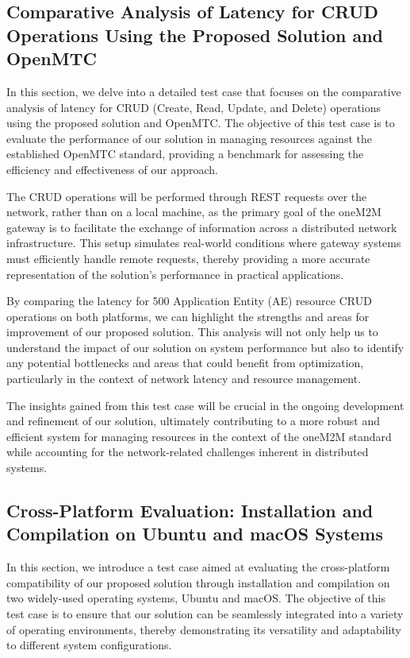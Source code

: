 \documentclass[a4paper,fleqn]{cas-dc}
\begin{document}
\subsection{Comparative Analysis of Latency for CRUD Operations Using the Proposed Solution and OpenMTC}

In this section, we delve into a detailed test case that focuses on the comparative analysis of latency for CRUD (Create, Read, Update, and Delete) operations using the proposed solution and OpenMTC. The objective of this test case is to evaluate the performance of our solution in managing resources against the established OpenMTC standard, providing a benchmark for assessing the efficiency and effectiveness of our approach.

The CRUD operations will be performed through REST requests over the network, rather than on a local machine, as the primary goal of the oneM2M gateway is to facilitate the exchange of information across a distributed network infrastructure. This setup simulates real-world conditions where gateway systems must efficiently handle remote requests, thereby providing a more accurate representation of the solution's performance in practical applications.

By comparing the latency for 500 Application Entity (AE) resource CRUD operations on both platforms, we can highlight the strengths and areas for improvement of our proposed solution. This analysis will not only help us to understand the impact of our solution on system performance but also to identify any potential bottlenecks and areas that could benefit from optimization, particularly in the context of network latency and resource management.

The insights gained from this test case will be crucial in the ongoing development and refinement of our solution, ultimately contributing to a more robust and efficient system for managing resources in the context of the oneM2M standard while accounting for the network-related challenges inherent in distributed systems.

\subsection{Cross-Platform Evaluation: Installation and Compilation on Ubuntu and macOS Systems}

In this section, we introduce a test case aimed at evaluating the cross-platform compatibility of our proposed solution through installation and compilation on two widely-used operating systems, Ubuntu and macOS. The objective of this test case is to ensure that our solution can be seamlessly integrated into a variety of operating environments, thereby demonstrating its versatility and adaptability to different system configurations.
\end{document}
